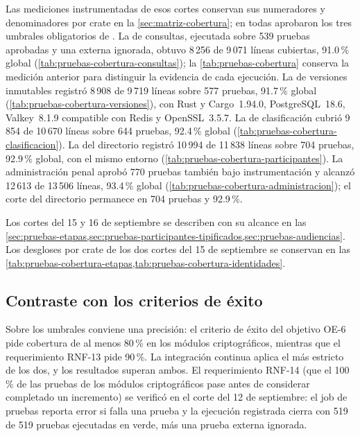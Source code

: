 Las mediciones instrumentadas de esos cortes conservan sus numeradores y denominadores por crate en la \cref{sec:matriz-cobertura}; en todas aprobaron los tres umbrales obligatorios de . La de consultas, ejecutada sobre 539 pruebas aprobadas y una externa ignorada, obtuvo 8\,256 de 9\,071 líneas cubiertas, 91.0\,\% global (\cref{tab:pruebas-cobertura-consultas}); la \cref{tab:pruebas-cobertura} conserva la medición anterior para distinguir la evidencia de cada ejecución. La de versiones inmutables registró 8\,908 de 9\,719 líneas sobre 577 pruebas, 91.7\,\% global (\cref{tab:pruebas-cobertura-versiones}), con Rust y Cargo~1.94.0, PostgreSQL~18.6, Valkey~8.1.9 compatible con Redis y OpenSSL~3.5.7. La de clasificación cubrió 9\,854 de 10\,670 líneas sobre 644 pruebas, 92.4\,\% global (\cref{tab:pruebas-cobertura-clasificacion}). La del directorio registró 10\,994 de 11\,838 líneas sobre 704 pruebas, 92.9\,\% global, con el mismo entorno (\cref{tab:pruebas-cobertura-participantes}). La administración penal aprobó 770 pruebas también bajo instrumentación y alcanzó 12\,613 de 13\,506 líneas, 93.4\,\% global (\cref{tab:pruebas-cobertura-administracion}); el corte del directorio permanece en 704 pruebas y 92.9\,\%.

Los cortes del 15 y 16 de septiembre se describen con su alcance en las \cref{sec:pruebas-etapas,sec:pruebas-participantes-tipificados,sec:pruebas-audiencias}. Los desgloses por crate de los dos cortes del 15 de septiembre se conservan en las \cref{tab:pruebas-cobertura-etapas,tab:pruebas-cobertura-identidades}.

\subsection{Contraste con los criterios de éxito}\label{sec:pruebas-criterios-exito}

Sobre los umbrales conviene una precisión: el criterio de éxito del objetivo OE-6 pide cobertura de al menos 80\,\% en los módulos criptográficos, mientras que el requerimiento RNF-13 pide 90\,\%. La integración continua aplica el más estricto de los dos, y los resultados superan ambos. El requerimiento RNF-14 (que el 100\,\% de las pruebas de los módulos criptográficos pase antes de considerar completado un incremento) se verificó en el corte del 12 de septiembre: el job de pruebas reporta error si falla una prueba y la ejecución registrada cierra con 519 de 519 pruebas ejecutadas en verde, más una prueba externa ignorada.

